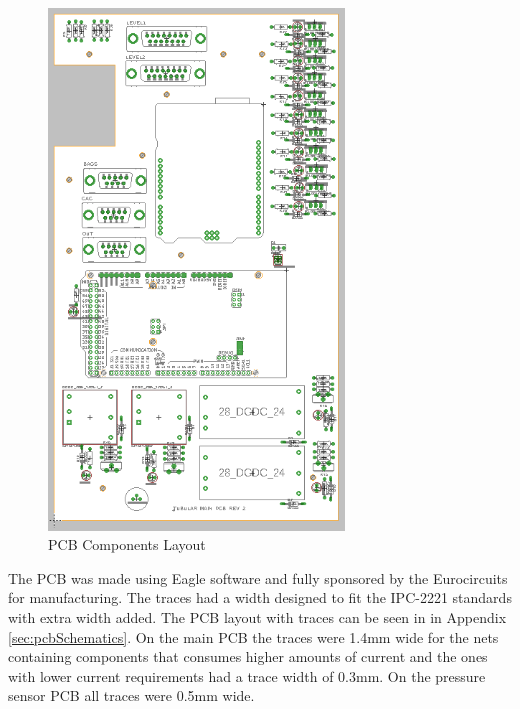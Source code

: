 \begin{figure}
    \centering
    \includegraphics[width=0.7\textwidth]{4-experiment-design/img/PCBLayout.png}
    \caption{PCB Components Layout}
    \label{fig:PCB-Components-Layout}
\end{figure}


The PCB was made using Eagle software and fully sponsored by the Eurocircuits for manufacturing. The traces had a width designed to fit the IPC-2221 standards\cite{IPC-2221B} with extra width added. The PCB layout with traces can be seen in in Appendix \ref{sec:pcbSchematics}. On the main PCB the traces were 1.4mm wide for the nets containing components that consumes higher amounts of current and the ones with lower current requirements had a trace width of 0.3mm. On the pressure sensor PCB all traces were 0.5mm wide.




\raggedbottom